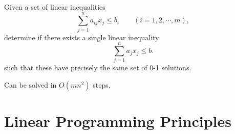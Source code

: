 \documentclass{myproc}
\begin{document}
\begin{problem}
Given a set of linear inequalities
\[\sum_{j=1}^n a_{ij}x_j \le b_i \qquad (i = 1, 2, \cdots, m),\]
determine if there exists a single linear inequality
\[\sum_{j=1}^n a_{j}x_j \le b.\]
such that these have precisely the same set of 0-1 solutions.
\end{problem}
\bit
\w Can be solved in $O(mn^2)$ steps.
\eit


\section{Linear Programming Principles}
\bit
\w {}
\eit





\end{document}
